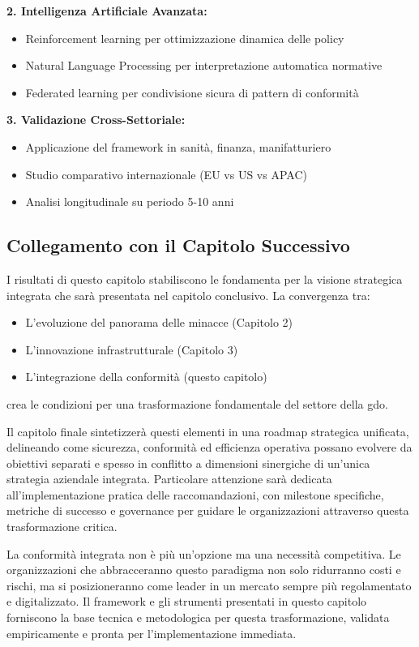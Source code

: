 \textbf{2. Intelligenza Artificiale Avanzata:}
\begin{itemize}
    \item Reinforcement learning per ottimizzazione dinamica delle policy
    \item Natural Language Processing per interpretazione automatica normative
    \item Federated learning per condivisione sicura di pattern di conformità
\end{itemize}

\textbf{3. Validazione Cross-Settoriale:}
\begin{itemize}
    \item Applicazione del framework in sanità, finanza, manifatturiero
    \item Studio comparativo internazionale (EU vs US vs APAC)
    \item Analisi longitudinale su periodo 5-10 anni
\end{itemize}

\subsection{Collegamento con il Capitolo Successivo}

I risultati di questo capitolo stabiliscono le fondamenta per la visione strategica integrata che sarà presentata nel capitolo conclusivo. La convergenza tra:
\begin{itemize}
    \item L'evoluzione del panorama delle minacce (Capitolo 2)
    \item L'innovazione infrastrutturale (Capitolo 3)
    \item L'integrazione della conformità (questo capitolo)
\end{itemize}

crea le condizioni per una trasformazione fondamentale del settore della \gls{gdo}.

Il capitolo finale sintetizzerà questi elementi in una roadmap strategica unificata, delineando come sicurezza, conformità ed efficienza operativa possano evolvere da obiettivi separati e spesso in conflitto a dimensioni sinergiche di un'unica strategia aziendale integrata. Particolare attenzione sarà dedicata all'implementazione pratica delle raccomandazioni, con milestone specifiche, metriche di successo e governance per guidare le organizzazioni attraverso questa trasformazione critica.

La conformità integrata non è più un'opzione ma una necessità competitiva. Le organizzazioni che abbracceranno questo paradigma non solo ridurranno costi e rischi, ma si posizioneranno come leader in un mercato sempre più regolamentato e digitalizzato. Il framework e gli strumenti presentati in questo capitolo forniscono la base tecnica e metodologica per questa trasformazione, validata empiricamente e pronta per l'implementazione immediata.

\printbibliography[
    heading=subbibliography,
]
\endrefsection %